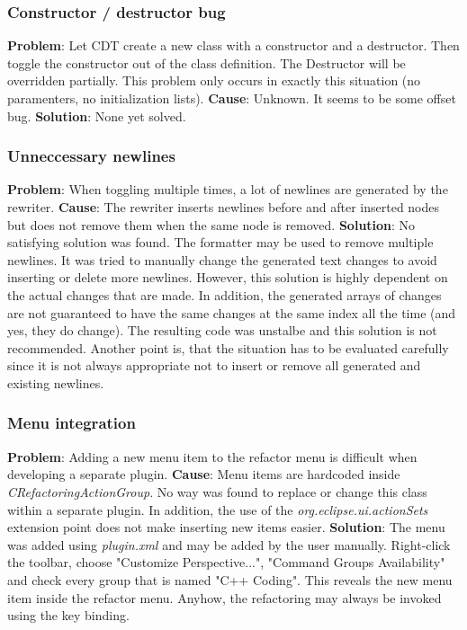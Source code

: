 \subsubsection{Constructor / destructor bug}
\textbf{Problem}: Let CDT create a new class with a constructor and a destructor. 
Then toggle the constructor out of the class definition. The Destructor will be 
overridden partially. This problem only occurs in exactly this situation (no 
paramenters, no initialization lists).
\textbf{Cause}: Unknown. It seems to be some offset bug.
\textbf{Solution}: None yet solved.

\subsubsection{Unneccessary newlines}
\textbf{Problem}: When toggling multiple times, a lot of newlines are generated 
by the rewriter.
\textbf{Cause}: The rewriter inserts newlines before and after inserted nodes 
but does not remove them when the same node is removed.
\textbf{Solution}: No satisfying solution was found. The formatter may be used 
to remove multiple newlines. It was tried to manually change the generated text 
changes to avoid inserting or delete more newlines. However, this solution is 
highly dependent on the actual changes that are made. In addition, the generated 
arrays of changes are not guaranteed to have the same changes at the same index 
all the time (and yes, they do change). The resulting code was unstalbe and this 
solution is not recommended. Another point is, that the situation has to be 
evaluated carefully since it is not always appropriate not to insert or remove 
all generated and existing newlines.

\subsubsection{Menu integration}
\textbf{Problem}: Adding a new menu item to the refactor menu is difficult when 
developing a separate plugin.
\textbf{Cause}: Menu items are hardcoded inside 
\textit{CRefactoringActionGroup}. No way was found to replace or change this 
class within a separate plugin. In addition, the use of the 
\textit{org.eclipse.ui.actionSets} extension point does not make inserting new 
items easier.
\textbf{Solution}: The menu was added using \textit{plugin.xml} and may be added 
by the user manually. Right-click the toolbar, choose "Customize Perspective...", 
"Command Groups Availability" and check every group that is named "C++ Coding". 
This reveals the new menu item inside the refactor menu. Anyhow, the refactoring 
may always be invoked using the key binding.

